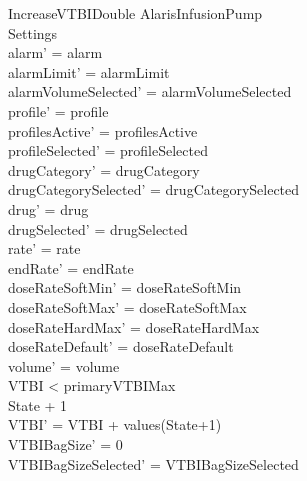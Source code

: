 \begin{schema}{IncreaseVTBIDouble}
	\Delta AlarisInfusionPump\\
	Settings\\
	\where
	alarm' = alarm\\
	alarmLimit' = alarmLimit\\
	alarmVolumeSelected' = alarmVolumeSelected\\
	profile' = profile\\
	profilesActive' = profilesActive\\  
	  profileSelected' = profileSelected\\
	drugCategory' = drugCategory\\ 
	\pagebreak
	drugCategorySelected' = drugCategorySelected\\
	drug' = drug\\ drugSelected' = drugSelected\\
	rate' = rate\\
	endRate' = endRate\\
	doseRateSoftMin' = doseRateSoftMin\\
	doseRateSoftMax' = doseRateSoftMax\\
	doseRateHardMax' = doseRateHardMax\\
	doseRateDefault' = doseRateDefault\\
	volume' = volume\\
	VTBI < primaryVTBIMax\\
	State + 1 \\
	VTBI' = VTBI + values(State+1)\\
	VTBIBagSize' = 0\\ VTBIBagSizeSelected' = VTBIBagSizeSelected\\

\end{schema}
